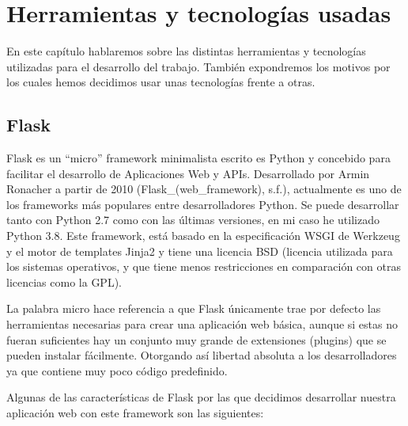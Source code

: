 \chapter{Herramientas y tecnologías usadas}
\label{cap:herramientas}


En este capítulo hablaremos sobre las distintas herramientas y tecnologías utilizadas para el desarrollo del trabajo. También expondremos los motivos por los cuales hemos decidimos usar unas tecnologías frente a otras.


\section{Flask}\label{sec:flask}


Flask es un ``micro'' framework minimalista escrito es Python y concebido para facilitar el desarrollo de Aplicaciones Web y APIs. Desarrollado por Armin Ronacher a partir de 2010 (Flask\_(web\_framework), s.f.), actualmente es uno de los frameworks más populares entre desarrolladores Python. Se puede desarrollar tanto con Python 2.7 como con las últimas versiones, en mi caso he utilizado Python 3.8. Este framework, está basado en la especificación WSGI de Werkzeug y el motor de templates Jinja2 y tiene una licencia BSD (licencia utilizada para los sistemas operativos, y que tiene menos restricciones en comparación con otras licencias como la GPL). 

La palabra micro hace referencia a que Flask únicamente trae por defecto las herramientas necesarias para crear una aplicación web básica, aunque si estas no fueran suficientes hay un conjunto muy grande de extensiones (plugins) que se pueden instalar fácilmente. Otorgando así libertad absoluta a los desarrolladores ya que contiene muy poco código predefinido.

Algunas de las características de Flask por las que decidimos desarrollar nuestra aplicación web con este framework son las siguientes:

